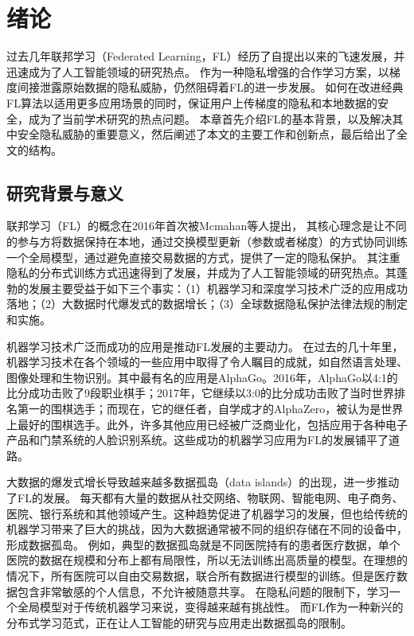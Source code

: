 \chapter{绪论}
过去几年联邦学习（Federated Learning，FL）经历了自提出以来的飞速发展，并迅速成为了人工智能领域的研究热点。
作为一种隐私增强的合作学习方案，以梯度间接泄露原始数据的隐私威胁，仍然阻碍着FL的进一步发展。
如何在改进经典FL算法以适用更多应用场景的同时，保证用户上传梯度的隐私和本地数据的安全，成为了当前学术研究的热点问题。
本章首先介绍FL的基本背景，以及解决其中安全隐私威胁的重要意义，然后阐述了本文的主要工作和创新点，最后给出了全文的结构。

\section{研究背景与意义} 
联邦学习（FL）的概念在2016年首次被Mcmahan等人\cite{mcmahan2017communication}提出，
其核心理念是让不同的参与方将数据保持在本地，通过交换模型更新（参数或者梯度）的方式协同训练一个全局模型，通过避免直接交易数据的方式，提供了一定的隐私保护。
其注重隐私的分布式训练方式迅速得到了发展，并成为了人工智能领域的研究热点\cite{bhagoji2019analyzing}。其蓬勃的发展主要受益于如下三个事实：（1）机器学习和深度学习技术广泛的应用成功落地；（2）大数据时代爆发式的数据增长；（3）全球数据隐私保护法律法规的制定和实施。

机器学习技术广泛而成功的应用是推动FL发展的主要动力。
在过去的几十年里，机器学习技术在各个领域的一些应用中取得了令人瞩目的成就，如自然语言处理\cite{devlin2018bert}、图像处理\cite{zhu2020neural}和生物识别\cite{yin20193d}。其中最有名的应用是AlphaGo\cite{silver2017mastering}。2016年，AlphaGo以4:1的比分成功击败了9段职业棋手；2017年，它继续以3:0的比分成功击败了当时世界排名第一的围棋选手；而现在，它的继任者，自学成才的AlphaZero，被认为是世界上最好的围棋选手。此外，许多其他应用已经被广泛商业化，包括应用于各种电子产品和门禁系统的人脸识别系统。这些成功的机器学习应用为FL的发展铺平了道路。

大数据的爆发式增长导致越来越多数据孤岛（data islands）的出现，进一步推动了FL的发展。
每天都有大量的数据从社交网络、物联网、智能电网、电子商务、医院、银行系统和其他领域产生\cite{hu2016energy}。这种趋势促进了机器学习的发展，但也给传统的机器学习带来了巨大的挑战，因为大数据通常被不同的组织存储在不同的设备中，形成数据孤岛。
例如，典型的数据孤岛就是不同医院持有的患者医疗数据，单个医院的数据在规模和分布上都有局限性，所以无法训练出高质量的模型。在理想的情况下，所有医院可以自由交易数据，联合所有数据进行模型的训练。但是医疗数据包含非常敏感的个人信息，不允许被随意共享。
在隐私问题的限制下，学习一个全局模型对于传统机器学习来说，变得越来越有挑战性。
而FL作为一种新兴的分布式学习范式，正在让人工智能的研究与应用走出数据孤岛的限制。

